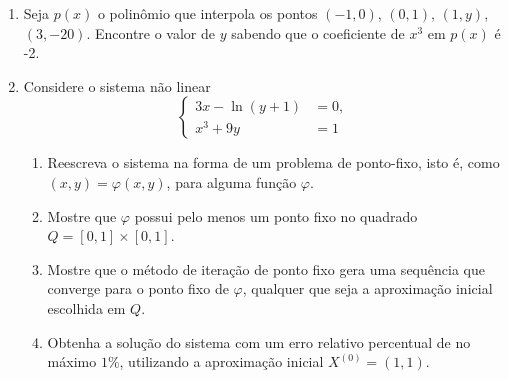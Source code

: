 \documentclass[12pt,a4paper]{article}
\begin{document}
\begin{enumerate}
\item Seja $p(x)$ o polinômio que interpola os pontos $(-1, 0)$, $(0, 1)$, $(1, y)$, $(3, -20)$. Encontre o valor de $y$ sabendo que o coeficiente de $x^3$ em $p(x)$ é -2.

\item Considere o sistema não linear
\[
\begin{cases}
3x - \ln(y + 1) &= 0,\\
x^3 + 9y &= 1
\end{cases}
\]
\begin{enumerate}
\item Reescreva o sistema na forma de um problema de ponto-fixo, isto é, como $(x,y) = \varphi(x,y)$, para alguma função $\varphi$.
\item Mostre que $\varphi$ possui pelo menos um ponto fixo no quadrado $Q = [0,1] \times [0,1]$.
\item Mostre que o método de iteração de ponto fixo gera uma sequência que converge para o ponto fixo de $\varphi$, qualquer que seja a aproximação inicial escolhida em $Q$.
\item Obtenha a solução do sistema com um erro relativo percentual de no máximo $1\%$, utilizando a aproximação inicial $X^{(0)} = (1, 1)$. 
\end{enumerate}
\end{enumerate}


\newpage
\end{document}
